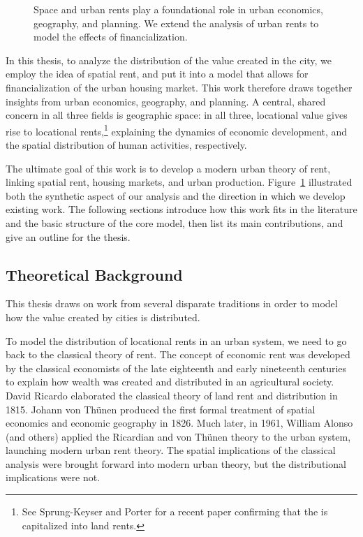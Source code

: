\begin{figure}[!ht]
\centering

\caption[Linking space and urban rents to the effects of financialization.]{Space and urban rents play a foundational role in urban economics, geography, and planning. We extend the analysis of urban rents to model the effects of financialization.}
\label{fig-fields}
\end{figure}
In this thesis, to analyze the distribution of the value created in the city, we employ the idea of spatial rent, and put it into a model that allows for financialization of the urban housing market. This work therefore draws together insights from urban economics, geography, and planning. A central, shared concern in all three fields is geographic space: in all three, locational value gives rise to locational rents,\footnote{See Sprung-Keyser and Porter \cite{medina-olivaresJointModelLongitudinal2023} for a recent paper confirming that the is capitalized into land rents.}  explaining the dynamics of economic development, and the spatial distribution of human activities,  respectively. 

The ultimate goal of this work is to develop a modern urban theory of rent, linking spatial rent, housing markets, and urban production. 
Figure~\ref{fig-fields} illustrated both the synthetic aspect of our analysis and the direction in which we develop existing work. The following sections introduce how this work fits in the literature and the basic structure of the core model, then list its main contributions, and give an outline for the thesis.

\subsection{Theoretical Background}

This thesis draws on work from several disparate traditions in order to model how the value created by cities is distributed.

To model the distribution of locational rents in an urban system, we need to go back to the classical theory of rent. The concept of economic rent was developed by the classical economists of the late eighteenth and early nineteenth centuries to explain how wealth was created and distributed in an agricultural society. David Ricardo \cite{ricardoEssayInfluenceLow1815} elaborated the classical theory of land rent and distribution in 1815.
Johann von Th\"unen \cite{vonthunenIsolirteStaatBeziehung1826} produced the first formal treatment of spatial economics and economic geography in 1826. Much later, in 1961, William Alonso (and others) \cite{alonsoModelUrbanLand1960} applied the Ricardian and von Th\"unen theory to the urban system, launching modern urban rent theory.  The spatial implications of the classical analysis were brought forward into modern urban theory, but the distributional implications were not. 

